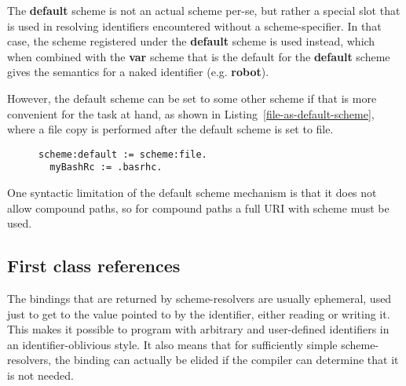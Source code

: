 \documentclass[preprint,authoryear]{acm_proc_article-sp}
\begin{document}
The {\bf default} scheme is not an actual scheme per-se, but rather a special slot
that is used in resolving identifiers encountered without a scheme-specifier.
In that case, the scheme registered under the {\bf default} scheme is used
instead, which when combined with the {\bf var} scheme that is the default
for the {\bf default} scheme gives the semantics for a naked identifier (e.g. {\bf robot}).

However, the default scheme can be set to some other scheme if that is more
convenient for the task at hand, as shown in Listing~\ref{file-as-default-scheme},
where a file copy is performed after the default scheme is set to file.


\begin{figure}[htbp]
\begin{lstlisting}[style=L,label=file-as-default-scheme,caption=File copy with file: as default scheme.]
  scheme:default := scheme:file.
  myBashRc := .basrhc.
\end{lstlisting}
\end{figure}

One syntactic limitation of the default scheme mechanism is that it does not allow
compound paths, so for compound paths a full URI with scheme must be used.


\subsection{First class references}

The bindings that are returned by scheme-resolvers are usually ephemeral, used just 
to get to the value pointed to by the identifier, either reading or writing it.  This
makes it possible to program with arbitrary and user-defined identifiers in
an identifier-oblivious style.  It also means that for sufficiently simple scheme-resolvers,
the binding can actually be elided if the compiler can determine that it is not needed.
\end{document}
